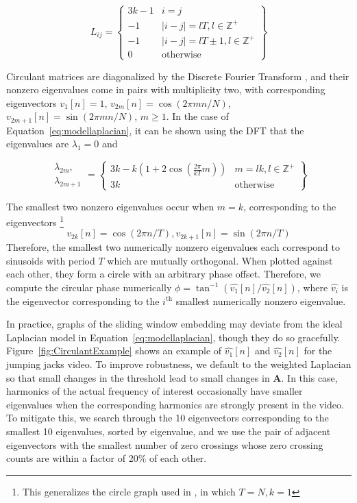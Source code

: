 \documentclass{article}
\newcommand{\mb}{\mathbf}
\begin{document}
\begin{equation}
\label{eq:modellaplacian}
L_{ij} = \left\{ \begin{array}{cc} 3k-1 & i = j \\ -1 & |i-j| = lT, l \in \mathbb{Z}^+ \\ -1 & |i-j| = lT \pm 1, l \in \mathbb{Z}^+ \\ 0 & \text{otherwise} \end{array} \right\}
\end{equation}

Circulant matrices are diagonalized by the Discrete Fourier Transform \cite{godsil2013algebraic}, and their nonzero eigenvalues come in pairs with multiplicity two, with corresponding eigenvectors $v_1[n] = 1$, $v_{2m}[n] = \cos(2 \pi mn / N)$, $v_{2m+1}[n] = \sin(2 \pi m n / N)$, $m \geq 1$.  In the case of Equation~\ref{eq:modellaplacian}, it can be shown using the DFT that the eigenvalues are $\lambda_1 = 0$ and 

\begin{equation}
\begin{array}{cc}\lambda_{2m},\\\lambda_{2m+1}\end{array} = \left\{ \begin{array}{cc} 3k - k\left( 1 + 2 \cos \left( \frac{2 \pi}{kT} m \right) \right) & m = lk, l \in \mathbb{Z}^+ \\ 3k & \text{otherwise}  \end{array} \right\} 
\end{equation}

The smallest two nonzero eigenvalues occur when $m = k$, corresponding to the eigenvectors \footnote{This generalizes the circle graph used in \cite{averbuch2015ringit}, in which $T = N, k = 1$} 
\begin{equation}
v_{2k}[n] = \cos(2 \pi n / T), v_{2k+1}[n] = \sin(2 \pi n / T)
\end{equation}
Therefore, the smallest two numerically nonzero eigenvalues each correspond to sinusoids with period $T$ which are mutually orthogonal.  When plotted against each other, they form a circle with an arbitrary phase offset.  Therefore, we compute the circular phase numerically $\phi = \tan^{-1}(\hat{v_1}[n] / \hat{v_2}[n])$, where $\hat{v_i}$ is the eigenvector corresponding to the $i^\text{th}$ smallest numerically nonzero eigenvalue.

In practice, graphs of the sliding window embedding may deviate from the ideal Laplacian model in Equation~\ref{eq:modellaplacian}, though they do so gracefully.  Figure~\ref{fig:CirculantExample} shows an example of $\hat{v_1}[n]$ and $\hat{v_2}[n]$ for the jumping jacks video.  To improve robustness, we default to the weighted Laplacian so that small changes in the threshold lead to small changes in $\mb{A}$.  In this case, harmonics of the actual frequency of interest occasionally have smaller eigenvalues when the corresponding harmonics are strongly present in the video.  To mitigate this, we search through the 10 eigenvectors corresponding to the smallest 10 eigenvalues, sorted by eigenvalue, and we use the pair of adjacent eigenvectors with the smallest number of zero crossings whose zero crossing counts are within a factor of 20$\%$ of each other.
\end{document}
